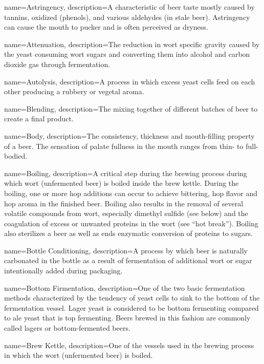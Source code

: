 {
  name={Astringency},
  description={A characteristic of beer taste mostly caused by tannins, oxidized (phenols), and various aldehydes (in stale beer). Astringency can cause the mouth to pucker and is often perceived as dryness.}
  }

{
  name={Attenuation},
  description={The reduction in wort specific gravity caused by the yeast consuming wort sugars and converting them into alcohol and carbon dioxide gas through fermentation.}
  }

{
  name={Autolysis},
  description={A process in which excess yeast cells feed on each other producing a rubbery or vegetal aroma.}
  }

{
  name={Blending},
  description={The mixing together of different batches of beer to create a final product.}
  }

{
  name={Body},
  description={The consistency, thickness and mouth-filling property of a beer. The sensation of palate fullness in the mouth ranges from thin- to full-bodied.}
  }

{
  name={Boiling},
  description={A critical step during the brewing process during which wort (unfermented beer) is boiled inside the brew kettle. During the boiling, one or more hop additions can occur to achieve bittering, hop flavor and hop aroma in the finished beer. Boiling also results in the removal of several volatile compounds from wort, especially dimethyl sulfide (see below) and the coagulation of excess or unwanted proteins in the wort (see ``hot break''). Boiling also sterilizes a beer as well as ends enzymatic conversion of proteins to sugars.}
  }

{
  name={Bottle Conditioning},
  description={A process by which beer is naturally carbonated in the bottle as a result of fermentation of additional wort or sugar intentionally added during packaging.}
  }

{
  name={Bottom Firmentation},
  description={One of the two basic fermentation methods characterized by the tendency of yeast cells to sink to the bottom of the fermentation vessel. Lager yeast is considered to be bottom fermenting compared to ale yeast that is top fermenting. Beers brewed in this fashion are commonly called lagers or bottom-fermented beers.}
  }

{
  name={Brew Kettle},
  description={One of the vessels used in the brewing process in which the wort (unfermented beer) is boiled.}
  }

